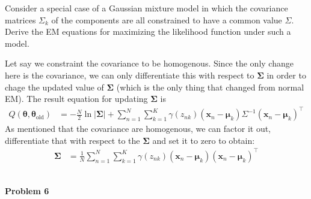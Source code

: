\documentclass{article}
\begin{document}
Consider a special case of a Gaussian mixture model in which the covariance matrices $\Sigma_k$ of the 
components are all constrained to have a common value $\Sigma$. Derive the EM equations for maximizing 
the likelihood function under such a model.
\color{blue}
\begin{sol}
Let say we constraint the covariance to be homogenous.
Since the only change here is the covariance, we can only differentiate this with respect to $\bm{\Sigma}$ in order to chage the updated value of $\bm{\Sigma}$ (which is the only thing that changed from normal EM).
The result equation for updating $\bm{\Sigma}$ is
\begin{align*}
Q(\bm{\theta}, \bm{\theta}_{\text{old}}) &= -\frac{N}{2} \ln |\bm{\Sigma}| + \sum_{n=1}^{N}\sum_{k=1}^K \gamma(z_{nk})(\mathbf{x}_n - \mathbf{\mu}_k)\Sigma^{-1}(\mathbf{x}_n - \mathbf{\mu}_k)^\top
\end{align*}
As mentioned that the covariance are homogenous, we can factor it out, differentiate that with respect to the $\bm{\Sigma}$ and set it to zero to obtain:
\begin{align*}
\bm{\Sigma} &= \frac{1}{N} \sum_{n=1}^N \sum_{k=1}^K \gamma(z_{nk})(\mathbf{x}_n - \mathbf{\mu}_k)(\mathbf{x}_n - \mathbf{\mu}_k)^\top
\end{align*}

\end{sol}
\color{black}
\leavevmode\\
\newpage
{}
\noindent
\Large{\textbf{Problem 6}}\normalsize
\\
\end{document}
